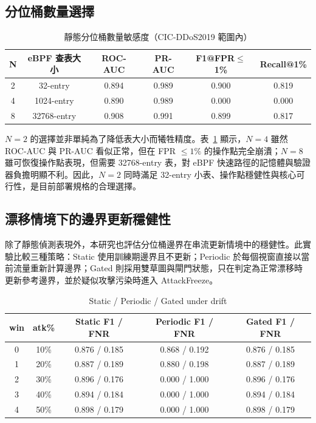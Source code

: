 \documentclass[12pt, a4paper, fontset=none]{ctexart}
\begin{document}
\subsection{分位桶數量選擇}
\begin{table}[H]
  \centering
  \caption{靜態分位桶數量敏感度（CIC-DDoS2019 範圍內）}
  \label{tab:k-sweep}
  \renewcommand{\arraystretch}{1.2}
  \begin{tabular}{c c c c c c}
    \toprule
    \textbf{N} & \textbf{eBPF 查表大小} & ROC-AUC & PR-AUC & F1@FPR$\leq$1\% & Recall@1\% \\
    \midrule
    2 & 32-entry & 0.894 & 0.989 & 0.900 & 0.819 \\
    4 & 1024-entry & 0.890 & 0.989 & 0.000 & 0.000 \\
    8 & 32768-entry & 0.908 & 0.991 & 0.899 & 0.817 \\
    \bottomrule
  \end{tabular}
\end{table}

$N=2$ 的選擇並非單純為了降低表大小而犧牲精度。表~\ref{tab:k-sweep} 顯示，$N=4$ 雖然 ROC-AUC 與 PR-AUC 看似正常，但在 FPR $\leq 1\%$ 的操作點完全崩潰；$N=8$ 雖可恢復操作點表現，但需要 32768-entry 表，對 eBPF 快速路徑的記憶體與驗證器負擔明顯不利。因此，$N=2$ 同時滿足 32-entry 小表、操作點穩健性與核心可行性，是目前部署規格的合理選擇。

\subsection{漂移情境下的邊界更新穩健性}
除了靜態偵測表現外，本研究也評估分位桶邊界在串流更新情境中的穩健性。此實驗比較三種策略：Static 使用訓練期邊界且不更新；Periodic 於每個視窗直接以當前流量重新計算邊界；Gated 則採用雙草圖與閘門狀態，只在判定為正常漂移時更新參考邊界，並於疑似攻擊污染時進入 AttackFreeze。

\begin{table}[H]
  \centering
  \caption{Static / Periodic / Gated under drift}
  \label{tab:drift-gated}
  \renewcommand{\arraystretch}{1.2}
  \begin{tabular}{c c c c c}
    \toprule
    \textbf{win} & \textbf{atk\%} & Static F1 / FNR & Periodic F1 / FNR & Gated F1 / FNR \\
    \midrule
    0 & 10\% & 0.876 / 0.185 & 0.868 / 0.192 & 0.876 / 0.185 \\
    1 & 20\% & 0.887 / 0.189 & 0.880 / 0.198 & 0.887 / 0.189 \\
    2 & 30\% & 0.896 / 0.176 & 0.000 / 1.000 & 0.896 / 0.176 \\
    3 & 40\% & 0.894 / 0.184 & 0.000 / 1.000 & 0.894 / 0.184 \\
    4 & 50\% & 0.898 / 0.179 & 0.000 / 1.000 & 0.898 / 0.179 \\
    \bottomrule
  \end{tabular}
\end{table}
\end{document}
